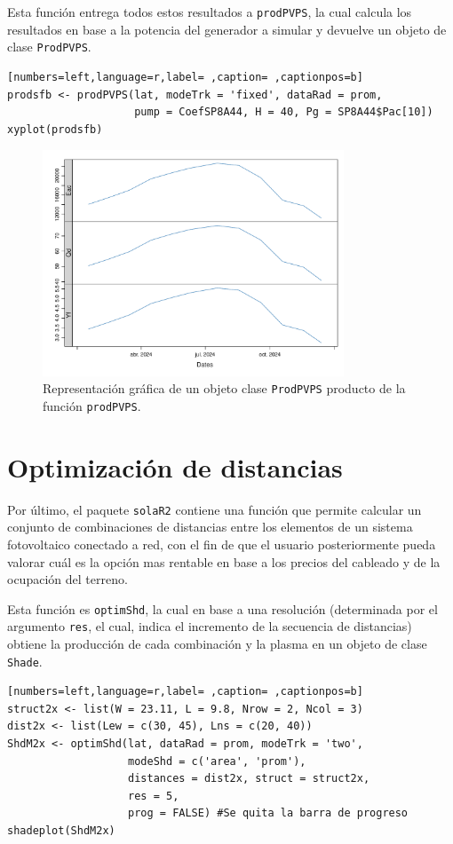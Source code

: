 \begin{itemize}
Esta función entrega todos estos resultados a \texttt{prodPVPS}, la cual calcula los resultados en base a la potencia del generador a simular y devuelve un objeto de clase \texttt{ProdPVPS}.
\begin{lstlisting}[numbers=left,language=r,label= ,caption= ,captionpos=b]
prodsfb <- prodPVPS(lat, modeTrk = 'fixed', dataRad = prom,
                    pump = CoefSP8A44, H = 40, Pg = SP8A44$Pac[10])
xyplot(prodsfb)
\end{lstlisting}

\begin{figure}[!htb]
\centering
\includegraphics[width=0.8\textwidth]{figuras/codigo-prodpvps.pdf}
\caption{Representación gráfica de un objeto clase \texttt{ProdPVPS} producto de la función \texttt{prodPVPS}.}
\end{figure}
\end{itemize}
\section{Optimización de distancias}
\label{sec:org0d79c8f}
\label{optimizacion-distancias}
Por último, el paquete \texttt{solaR2} contiene una función que permite calcular un conjunto de combinaciones de distancias entre los elementos de un sistema fotovoltaico conectado a red, con el fin de que el usuario posteriormente pueda valorar cuál es la opción mas rentable en base a los precios del cableado y de la ocupación del terreno.

Esta función es \texttt{optimShd}, la cual en base a una resolución (determinada por el argumento \texttt{res}, el cual, indica el incremento de la secuencia de distancias) obtiene la producción de cada combinación y la plasma en un objeto de clase \texttt{Shade}.
\begin{lstlisting}[numbers=left,language=r,label= ,caption= ,captionpos=b]
struct2x <- list(W = 23.11, L = 9.8, Nrow = 2, Ncol = 3)
dist2x <- list(Lew = c(30, 45), Lns = c(20, 40))
ShdM2x <- optimShd(lat, dataRad = prom, modeTrk = 'two',
                   modeShd = c('area', 'prom'),
                   distances = dist2x, struct = struct2x,
                   res = 5,
                   prog = FALSE) #Se quita la barra de progreso
shadeplot(ShdM2x)
\end{lstlisting}

